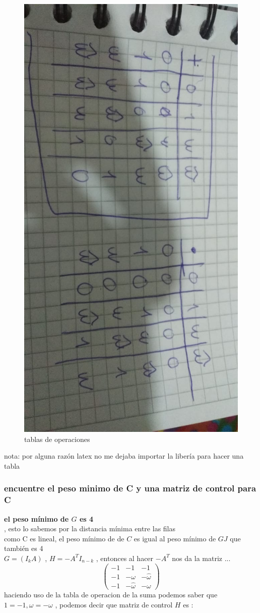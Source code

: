 \documentclass[10pt,a4paper]{article} %
\begin{document}
        \begin{figure}[h!]
            \centering
            \includegraphics[width=0.4\linewidth , angle = 90]{control.jpeg}
            \caption{tablas de operaciones}
            \label{operaciones}
        \end{figure}
        \color{blue} nota: por alguna razón latex no me dejaba importar la
        libería para hacer una tabla \color{black}



        \subsubsection{encuentre el peso minimo de C y una matriz de control para C}


        \textbf{el peso mínimo de $G$ es 4}
        \\
       , esto lo sabemos por la distancia mínima
        entre las filas
        \\
        como C es lineal, el peso mínimo de de $C$ es igual al peso mínimo de
        $GJ$ que también es 4
        \\
        $G = (I_k A)$ , $H = -A ^{T} I_{n-k} $ , entonces al hacer $-A ^{T}$
        nos da la matriz ...
        \begin{equation}
            \begin{pmatrix}
                -1 & -1 & -1
                \\
                -1 & -\omega  & -\hat{\omega }
                \\
                -1 & -\hat{\omega}  & -\omega
            \end{pmatrix}
        \end{equation}
        haciendo uso de  la tabla de operacion de la suma podemos saber que $1
        = -1 ,
        \omega  = -\omega $ , podemos decir que  matriz de control    $H$ es :
\end{document}
